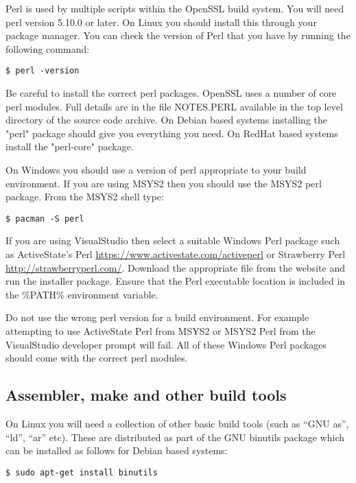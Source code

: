 Perl is used by multiple scripts within the OpenSSL build system. You will need perl
version 5.10.0 or later. On Linux you should install this through your package manager.
You can check the version of Perl that you have by running the following command:

\begin{verbatim}
$ perl -version
\end{verbatim}

Be careful to install the correct perl packages. OpenSSL uses a number of core perl
modules. Full details are in the file NOTES.PERL available in the top level directory
of the source code archive. On Debian based systems installing the "perl" package
should give you everything you need. On RedHat based systems install the "perl-core"
package.

On Windows you should use a version of perl appropriate to your build environment. If
you are using MSYS2 then you should use the MSYS2 perl package. From the MSYS2 shell
type:

\begin{verbatim}
$ pacman -S perl
\end{verbatim}

If you are using VisualStudio then select a suitable Windows Perl package such as
 ActiveState's Perl \url{https://www.activestate.com/activeperl} or Strawberry Perl
\url{http://strawberryperl.com/}. Download the appropriate file from the website and
run the installer package. Ensure that the Perl executable location is included in
the \%PATH\% environment variable.

Do not use the wrong perl version for a build environment. For example attempting to
use ActiveState Perl from MSYS2 or MSYS2 Perl from the VisualStudio developer prompt
will fail. All of these Windows Perl packages should come with the correct perl modules.

\subsection{Assembler, make and other build tools} \label{sec:getting-prereq-assem}

On Linux you will need a collection of other basic build tools (such as ``GNU as'',
``ld'', ``ar'' etc). These are distributed as part of the GNU binutils package
which can be installed as follows for Debian based systems:

\begin{verbatim}
$ sudo apt-get install binutils
\end{verbatim}

